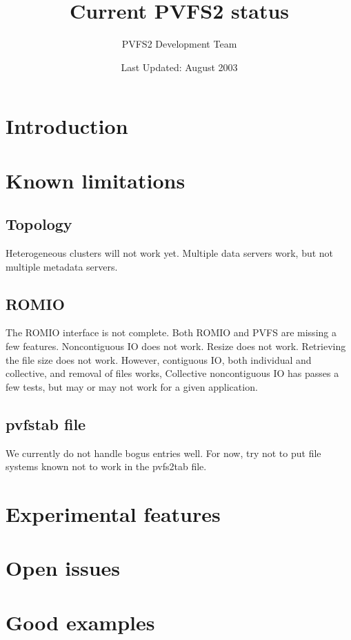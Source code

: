 \documentclass[11pt, letterpaper]{article}
\title{Current PVFS2 status}
\author{ PVFS2 Development Team }
\date{ Last Updated: August 2003 }
\begin{document}
\maketitle

\tableofcontents

\newpage

\thispagestyle{empty}

\setlength{\parindent}{0.0cm}

\section{Introduction}
\section{Known limitations}
\subsection{Topology}

Heterogeneous clusters will not work yet.  Multiple data servers work, but not
multiple metadata servers.

\subsection{ROMIO}

The ROMIO interface is not complete.  Both ROMIO and PVFS are missing a few
features.  Noncontiguous IO does not work.   Resize does not work.   Retrieving
the file size does not work.  However, contiguous IO, both individual and
collective, and removal of files works,   Collective noncontiguous IO has
passes a few tests, but may or may not work for a given application.  

\subsection{pvfstab file}
We currently do not handle bogus entries well.  For now, try not to put file
systems known not to work in the pvfs2tab file.

\section{Experimental features}
\section{Open issues}
\section{Good examples}
\end{document}
